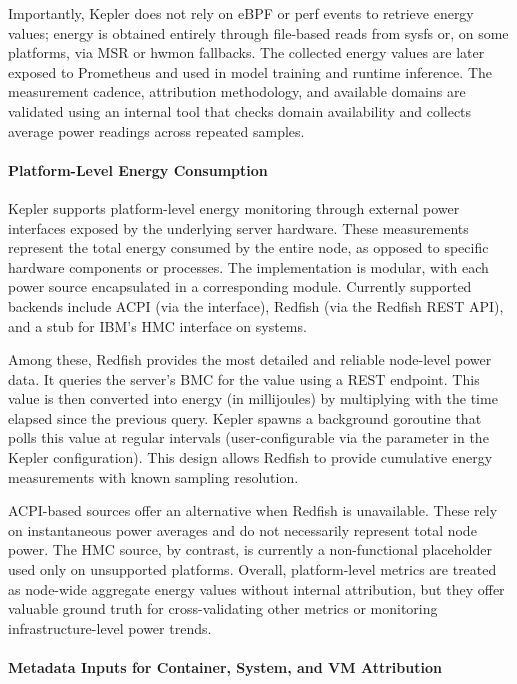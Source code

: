 Importantly, Kepler does not rely on eBPF or perf events to retrieve energy values; energy is obtained entirely through file-based reads from sysfs or, on some platforms, via MSR or hwmon fallbacks. The collected energy values are later exposed to Prometheus and used in model training and runtime inference. The measurement cadence, attribution methodology, and available domains are validated using an internal tool that checks domain availability and collects average power readings across repeated samples.

\paragraph{Platform-Level Energy Consumption}
Kepler supports platform-level energy monitoring through external power interfaces exposed by the underlying server hardware. These measurements represent the total energy consumed by the entire node, as opposed to specific hardware components or processes. The implementation is modular, with each power source encapsulated in a corresponding  module. Currently supported backends include ACPI (via the  interface), Redfish (via the Redfish REST API), and a stub for IBM's HMC interface on  systems.

Among these, Redfish provides the most detailed and reliable node-level power data. It queries the server's BMC for the  value using a REST endpoint. This value is then converted into energy (in millijoules) by multiplying with the time elapsed since the previous query. Kepler spawns a background goroutine that polls this value at regular intervals (user-configurable via the  parameter in the Kepler configuration). This design allows Redfish to provide cumulative energy measurements with known sampling resolution.

ACPI-based sources offer an alternative when Redfish is unavailable. These rely on instantaneous power averages and do not necessarily represent total node power. The HMC source, by contrast, is currently a non-functional placeholder used only on unsupported platforms. Overall, platform-level metrics are treated as node-wide aggregate energy values without internal attribution, but they offer valuable ground truth for cross-validating other metrics or monitoring infrastructure-level power trends.

\paragraph{Metadata Inputs for Container, System, and VM Attribution}

